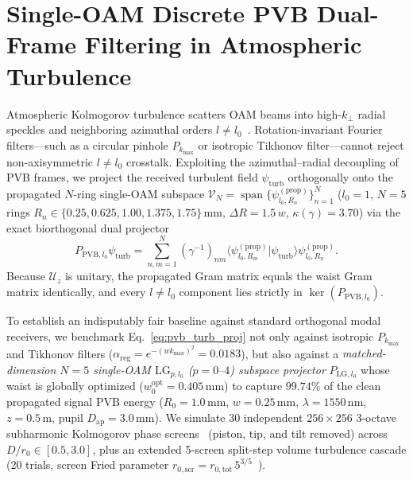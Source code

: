 \documentclass{optica-article}
\newcommand{\braket}[2]{\langle #1 | #2 \rangle}
\begin{document}
\section{Single-OAM Discrete PVB Dual-Frame Filtering in Atmospheric Turbulence}
\label{sec:turbulence}

Atmospheric Kolmogorov turbulence scatters OAM beams into high-$k_\perp$ radial speckles and neighboring azimuthal orders $l \neq l_0$~\cite{Paterson2005,TylerBoyd2009,Roux2011,Ibrahim2013,AndrewsPhillips2005}. Rotation-invariant Fourier filters---such as a circular pinhole $P_{k_{\max}}$ or isotropic Tikhonov filter---cannot reject non-axisymmetric $l \neq l_0$ crosstalk. Exploiting the azimuthal--radial decoupling of PVB frames, we project the received turbulent field $\psi_{\mathrm{turb}}$ orthogonally onto the propagated $N$-ring single-OAM subspace $\mathcal{V}_N = \operatorname{span}\{\psi_{l_0,R_n}^{(\mathrm{prop})}\}_{n=1}^N$ ($l_0 = 1$, $N = 5$ rings $R_n \in \{0.25, 0.625, 1.00, 1.375, 1.75\}\,\mathrm{mm}$, $\Delta R = 1.5\,w$, $\kappa(\gamma) = 3.70$) via the exact biorthogonal dual projector
\begin{equation}
  P_{\mathrm{PVB},l_0}\psi_{\mathrm{turb}} = \sum_{n,m=1}^{N} (\gamma^{-1})_{nm}\braket{\psi_{l_0,R_m}^{(\mathrm{prop})}}{\psi_{\mathrm{turb}}}\psi_{l_0,R_n}^{(\mathrm{prop})}.
  \label{eq:pvb_turb_proj}
\end{equation}
Because $\mathcal{U}_z$ is unitary, the propagated Gram matrix equals the waist Gram matrix identically, and every $l \neq l_0$ component lies strictly in $\ker(P_{\mathrm{PVB},l_0})$.

To establish an indisputably fair baseline against standard orthogonal modal receivers, we benchmark Eq.~\eqref{eq:pvb_turb_proj} not only against isotropic $P_{k_{\max}}$ and Tikhonov filters ($\alpha_{\mathrm{reg}} = e^{-(wk_{\max})^2} = 0.0183$), but also against a \emph{matched-dimension $N = 5$ single-OAM $\mathrm{LG}_{p,l_0}$ ($p = 0\text{--}4$) subspace projector} $P_{\mathrm{LG},l_0}$ whose waist is globally optimized ($w_0^{\mathrm{opt}} = 0.405\,\mathrm{mm}$) to capture $99.74\%$ of the clean propagated signal PVB energy ($R_0 = 1.0\,\mathrm{mm}$, $w = 0.25\,\mathrm{mm}$, $\lambda = 1550\,\mathrm{nm}$, $z = 0.5\,\mathrm{m}$, pupil $D_{\mathrm{ap}} = 3.0\,\mathrm{mm}$). We simulate 30 independent $256\times 256$ 3-octave subharmonic Kolmogorov phase screens~\cite{Lane1992} (piston, tip, and tilt removed) across $D/r_0 \in [0.5, 3.0]$, plus an extended 5-screen split-step volume turbulence cascade (20 trials, screen Fried parameter $r_{0,\mathrm{scr}} = r_{0,\mathrm{tot}}\,5^{3/5}$~\cite{Roux2011}).
\end{document}
